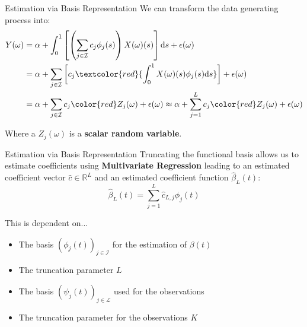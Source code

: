 \documentclass{beamer}
\begin{document}
	\begin{frame}{Estimation via Basis Representation}\label{ReducedEq}
		We can transform the data generating process into:
		\begin{equation}\notag
			\begin{split}
				Y(\omega) & = \alpha + \int_{0}^{1}\left[\left(\sum_{j \in \mathcal{I}} c_j  \phi_j(s)\right) X(\omega)(s) \right]\mathrm{d}s + \epsilon(\omega) \\
						  & = \alpha + \sum_{j \in \mathcal{I}} \left[c_j \textcolor{red}{\int_{0}^{1} X(\omega)(s) \phi_j(s)\mathrm{d}s}\right] + \epsilon(\omega)	 \\
						  & = \alpha + \sum_{j \in \mathcal{I}} c_j {\color{red}Z_j(\omega)} + \epsilon(\omega)  \approx  \alpha + \sum_{j = 1}^{L} c_j {\color{red}Z_j(\omega)}  + \epsilon(\omega)
			\end{split}
		\end{equation}
	
		Where a $Z_j(\omega)$ is a \textbf{scalar random variable}.
		
		\hyperlink{FullEq}{}
	\end{frame}

	\begin{frame}{Estimation via Basis Representation}
		Truncating the functional basis allows us to estimate coefficients using \textbf{Multivariate Regression} leading to an estimated coefficient vector $\hat{c} \in \mathbb{R}^L$ and an estimated coefficient function $\hat{\beta}_L(t)$:
		\vspace{-0.2cm}
		$$\hat{\beta}_L(t) = \sum_{j = 1}^{L} \hat{c}_{L,j} \phi_j(t)$$
		
		This is dependent on...\vspace{-0.2cm}
		\begin{multicols}{2}
			\begin{itemize}
				\item The basis $(\phi_j(t))_{j \in \mathcal{I}}$ for the estimation of $\beta(t)$
				\item The truncation parameter $L$\vfill\null
				\item The basis $(\psi_j(t))_{j \in \mathcal{L}}$ used for the observations
				\item The truncation parameter for the observations $K$
			\end{itemize}
		\end{multicols}
	\end{frame}
\end{document}
